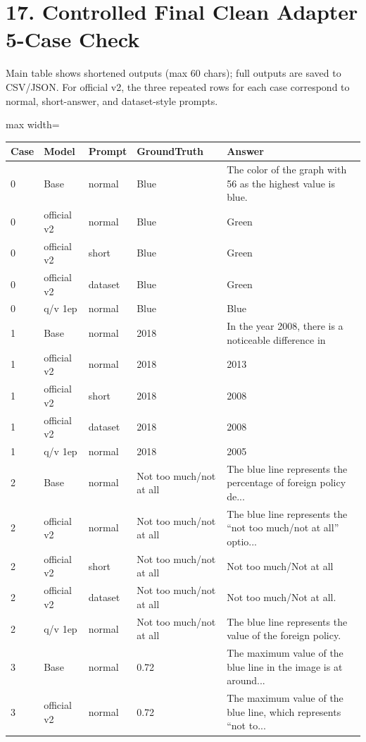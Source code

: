 \documentclass[11pt]{article}
\begin{document}
\section*{17. Controlled Final Clean Adapter 5-Case Check}
Main table shows shortened outputs (max 60 chars); full outputs are saved to CSV/JSON. For official v2, the three repeated rows for each case correspond to normal, short-answer, and dataset-style prompts.
\begin{center}\scriptsize\begin{adjustbox}{max width=\textwidth}
\begin{tabular}{llllp{}}
\toprule
Case & Model & Prompt & GroundTruth & Answer \\
\midrule
0 & Base & normal & Blue & The color of the graph with 56 as the highest value is blue. \\
0 & official v2 & normal & Blue & Green \\
0 & official v2 & short & Blue & Green \\
0 & official v2 & dataset & Blue & Green \\
0 & q/v 1ep & normal & Blue & Blue \\
1 & Base & normal & 2018 & In the year 2008, there is a noticeable difference in \\
1 & official v2 & normal & 2018 & 2013 \\
1 & official v2 & short & 2018 & 2008 \\
1 & official v2 & dataset & 2018 & 2008 \\
1 & q/v 1ep & normal & 2018 & 2005 \\
2 & Base & normal & Not too much/not at all & The blue line represents the percentage of foreign policy de... \\
2 & official v2 & normal & Not too much/not at all & The blue line represents the ``not too much/not at all'' optio... \\
2 & official v2 & short & Not too much/not at all & Not too much/Not at all \\
2 & official v2 & dataset & Not too much/not at all & Not too much/Not at all. \\
2 & q/v 1ep & normal & Not too much/not at all & The blue line represents the value of the foreign policy. \\
3 & Base & normal & 0.72 & The maximum value of the blue line in the image is at around... \\
3 & official v2 & normal & 0.72 & The maximum value of the blue line, which represents ``not to... \\

\end{tabular}
\end{adjustbox}
\end{center}
\end{document}
